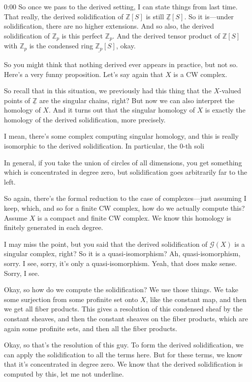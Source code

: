 \begin{unfinished}{0:00}
So once we pass to the derived setting, I can state things from last time. That really, the derived solidification of $\mathbb{Z}[S]$ is still $\underline{\mathbb{Z}}[S]$. So it is---under solidification, there are no higher extensions. And so also, the derived solidification of $\mathbb{Z}_p$ is this perfect $\mathbb{Z}_p$. And the derived tensor product of $\mathbb{Z}[S]$ with $\mathbb{Z}_p$ is the condensed ring $\underline{\mathbb{Z}_p}[S]$, okay.

So you might think that nothing derived ever appears in practice, but not so. Here's a very funny proposition. Let's say again that $X$ is a CW complex.

So recall that in this situation, we previously had this thing that the $X$-valued points of $\underline{\mathbb{Z}}$ are the singular chains, right? But now we can also interpret the homology of $X$. And it turns out that the singular homology of $X$ is exactly the homology of the derived solidification, more precisely.

I mean, there's some complex computing singular homology, and this is really isomorphic to the derived solidification. In particular, the $0$-th soli

In general, if you take the union of circles of all dimensions, you get something which is concentrated in degree zero, but solidification goes arbitrarily far to the left.

So again, there's the formal reduction to the case of complexes---just assuming I keep, which, and so for a finite CW complex, how do we actually compute this? Assume $X$ is a compact and finite CW complex. We know this homology is finitely generated in each degree.

I may miss the point, but you said that the derived solidification of $\mathcal{G}(X)$ is a singular complex, right? So it is a quasi-isomorphism? Ah, quasi-isomorphism, sorry. I see, sorry, it's only a quasi-isomorphism. Yeah, that does make sense. Sorry, I see.

Okay, so how do we compute the solidification? We use those things. We take some surjection from some profinite set onto $X$, like the constant map, and then we get all fiber products. This gives a resolution of this condensed sheaf by the constant sheaves, and then the constant sheaves on the fiber products, which are again some profinite sets, and then all the fiber products.

Okay, so that's the resolution of this guy. To form the derived solidification, we can apply the solidification to all the terms here. But for these terms, we know that it's concentrated in degree zero. We know that the derived solidification is computed by this, let me not underline.


\end{unfinished}
